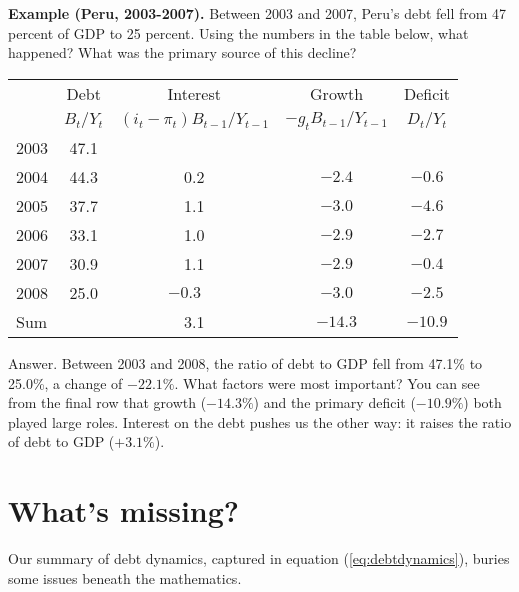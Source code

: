 \textbf{Example (Peru, 2003-2007).}
Between 2003 and 2007,
Peru's debt fell from 47 percent of GDP to 25 percent.
Using the numbers in the table below, what happened?
What was the primary source of this decline?

\begin{center}
\begin{tabular*}{\textwidth}{lcccc}
\toprule
        & Debt   & Interest &  Growth
            & \phantom{x}Deficit\phantom{x} \\
        &  $B_{t}/Y_{t}$ &  $(i_t-\pi_t)B_{t-1}/Y_{t-1}$  &  $-g_t B_{t-1}/Y_{t-1}$
                & $D_t/Y_t$ \\
\midrule
2003\phantom{xxxx}
            & 47.1 &  \\
2004        & 44.3 & 0.2 & $-2.4$ & $-0.6$  \\
2005        & 37.7 & 1.1 & $-3.0$ & $-4.6$  \\
2006        & 33.1 & 1.0 & $-2.9$ & $-2.7$  \\
2007        & 30.9 & 1.1 & $-2.9$ & $-0.4$  \\
2008        & 25.0 & $-0.3\phantom{-}$ & $-3.0$ & $-2.5$ \\
\midrule
Sum         &      & 3.1 & $-14.3$ & $-10.9$ \\
\bottomrule
\end{tabular*}
\end{center}

Answer.
Between 2003 and 2008,
the ratio of debt to GDP fell from 47.1\% to 25.0\%,
a change of $-22.1\%$.
What factors were most important?
You can see from the final row that
growth ($-14.3\%$) and the primary deficit ($-10.9\%$) both played large roles.
Interest on the debt pushes us the other way: it raises
the ratio of debt to GDP ($+3.1\%$).


\section{What's missing?}

Our summary of debt dynamics,
captured in equation (\ref{eq:debtdynamics}), buries some issues beneath the mathematics.

